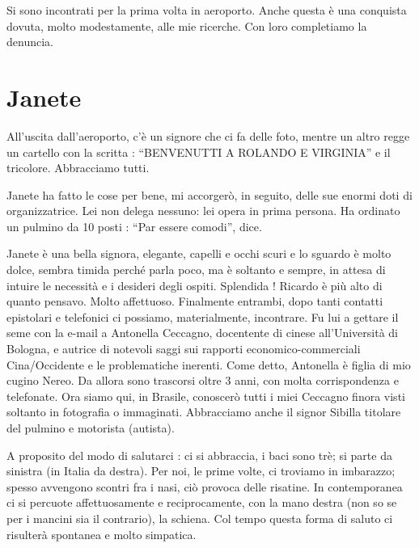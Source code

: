 \documentclass[a4paper,10pt]{book}
\begin{document}
Si sono incontrati per la prima volta in aeroporto. Anche questa è una conquista dovuta, molto modestamente, alle mie ricerche.
Con loro completiamo la denuncia.

\section{Janete}

All’uscita dall’aeroporto, c’è un signore che ci fa delle foto, mentre un altro regge un cartello con la scritta : “BENVENUTTI A ROLANDO E VIRGINIA” e il tricolore. Abbracciamo tutti.

Janete ha fatto le cose per bene, mi accorgerò,  in seguito, delle sue enormi doti di organizzatrice. Lei non delega nessuno: lei opera in prima persona. Ha ordinato un pulmino da 10 posti : “Par essere comodi”, dice.

Janete è una bella signora, elegante, capelli e occhi scuri e lo sguardo è molto dolce, sembra timida perché parla poco, ma è soltanto e sempre, in attesa di intuire le necessità e i desideri degli ospiti. Splendida !
Ricardo è più alto di quanto pensavo. Molto affettuoso. Finalmente entrambi, dopo tanti contatti epistolari e telefonici ci possiamo, materialmente, incontrare. Fu lui a gettare il seme con la e-mail a Antonella Ceccagno, docentente di cinese all’Università di Bologna, e autrice di notevoli saggi sui rapporti economico-commerciali Cina/Occidente e le problematiche inerenti. Come detto, Antonella è figlia di mio cugino Nereo. 
Da allora sono trascorsi oltre 3 anni, con molta corrispondenza e telefonate.
Ora siamo qui, in Brasile, conoscerò tutti i miei Ceccagno finora visti soltanto in fotografia o immaginati.
Abbracciamo  anche il signor Sibilla titolare del pulmino e motorista (autista).

A proposito del modo di salutarci : ci si abbraccia, i baci sono trè; si parte da sinistra (in Italia da destra). Per noi, le prime volte, ci troviamo in imbarazzo; spesso avvengono scontri fra i nasi, ciò provoca delle risatine. In contemporanea ci si percuote affettuosamente  e reciprocamente, con la mano destra (non so se per i mancini sia il contrario), la schiena.  Col tempo questa forma di saluto ci risulterà spontanea e molto simpatica.
\end{document}
